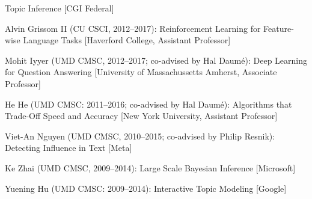 \begin{enumerate*}
  Topic Inference [CGI Federal]
\item Alvin Grissom II (CU CSCI, 2012--2017):
  Reinforcement Learning for Feature-wise Language Tasks [Haverford College, Assistant Professor]
\item Mohit Iyyer (UMD CMSC, 2012--2017; co-advised by Hal Daum\'e): Deep Learning for Question
  Answering [University of Massachussetts Amherst,
  Associate Professor]
\item He He (UMD CMSC: 2011--2016; co-advised by Hal Daum\'e): Algorithms that Trade-Off Speed and Accuracy [New York University, Assistant Professor]
\item Viet-An Nguyen (UMD CMSC, 2010--2015; co-advised by Philip Resnik): Detecting Influence in Text [Meta]
\item Ke Zhai (UMD CMSC, 2009--2014): Large Scale Bayesian Inference [Microsoft]
\item Yuening Hu (UMD CMSC: 2009--2014): Interactive Topic Modeling [Google]
\end{enumerate*}
